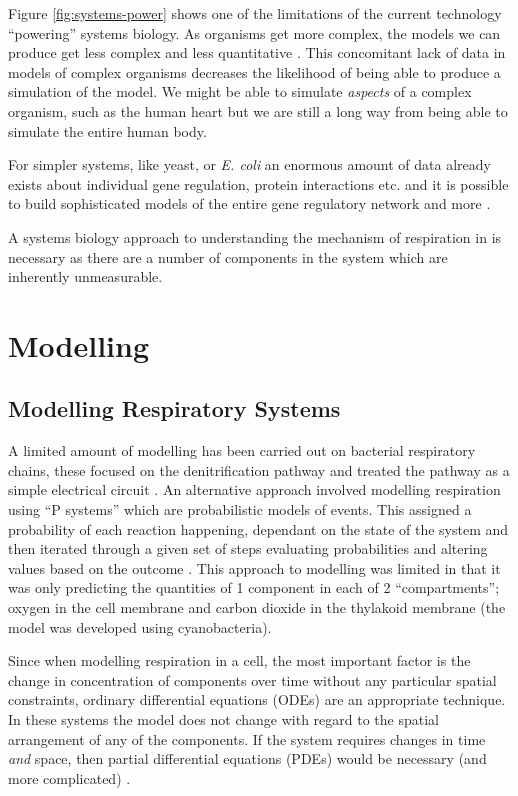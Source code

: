 Figure \ref{fig:systems-power} shows one of the limitations of the current technology ``powering'' systems biology. As organisms get more complex, the models we can produce get less complex and less quantitative \cite{Kahlem2006}. This concomitant lack of data in models of complex organisms decreases the likelihood of being able to produce a simulation of the model. We might be able to simulate \textit{aspects} of a complex organism, such as the human heart\cite{Crampin2004} but we are still a long way from being able to simulate the entire human body.

For simpler systems, like yeast, or \textit{E. coli} an enormous amount of data already exists about individual gene regulation, protein interactions etc. and it is possible to build sophisticated models of the entire gene regulatory network and more \cite{Barabasi2004,Peercy2006}.

A systems biology approach to understanding the mechanism of respiration in \Nsm{} is necessary as there are a number of components in the system which are inherently unmeasurable.

\section{Modelling}

\subsection{Modelling Respiratory Systems}

A limited amount of modelling has been carried out on bacterial respiratory chains, these focused on the denitrification pathway and treated the pathway as a simple electrical circuit \cite{Almeida1997}. An alternative approach involved modelling respiration using ``P systems'' which are probabilistic models of events. This assigned a probability of each reaction happening, dependant on the state of the system and then iterated through a given set of steps evaluating probabilities and altering values based on the outcome \cite{Cavaliere2006}. This approach to modelling was limited in that it was only predicting the quantities of 1 component in each of 2 ``compartments''; oxygen in the cell membrane and carbon dioxide in the thylakoid membrane (the model was developed using cyanobacteria).

Since when modelling respiration in a cell, the most important factor is the change in concentration of components over time without any particular spatial constraints, ordinary differential equations (ODEs) are an appropriate technique. In these systems the model does not change with regard to the spatial arrangement of any of the components. If the system requires changes in time \textit{and} space, then partial differential equations (PDEs) would be necessary (and more complicated) \cite{Klipp2005}.

